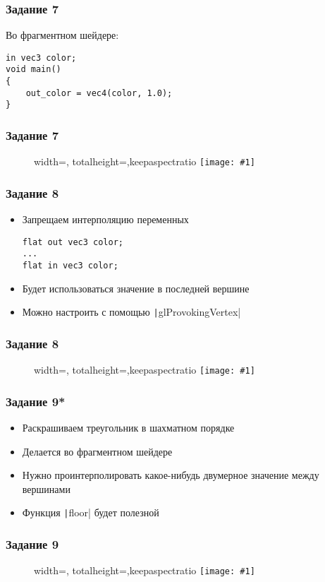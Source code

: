 \documentclass[10pt]{beamer}
\newcommand{\slideimage}[1]{
  \begin{figure}
    \begin{adjustbox}{width=\textwidth, totalheight=\textheight-2\baselineskip-2\baselineskip,keepaspectratio}
      \texttt{[image: \#1]}
    \end{adjustbox}
  \end{figure}
}
\begin{document}
\begin{frame}[fragile]
\frametitle{Задание 7}
Во фрагментном шейдере:
\begin{verbatim}
in vec3 color;
void main()
{
    out_color = vec4(color, 1.0);
}
\end{verbatim}
\end{frame}

\begin{frame}[fragile]
\frametitle{Задание 7}
\slideimage{task_7.png}
\end{frame}

\begin{frame}[fragile]
\frametitle{Задание 8}
\begin{itemize}
\item Запрещаем интерполяцию переменных
\begin{verbatim}
flat out vec3 color;
...
flat in vec3 color;
\end{verbatim}
\item Будет использоваться значение в последней вершине
\item Можно настроить с помощью \texttt|glProvokingVertex|
\end{itemize}
\end{frame}

\begin{frame}[fragile]
\frametitle{Задание 8}
\slideimage{task_8.png}
\end{frame}

\begin{frame}[fragile]
\frametitle{Задание 9*}
\begin{itemize}
\item Раскрашиваем треугольник в шахматном порядке
\item Делается во фрагментном шейдере
\item Нужно проинтерполировать какое-нибудь двумерное значение между вершинами
\item Функция \texttt|floor| будет полезной
\end{itemize}
\end{frame}

\begin{frame}[fragile]
\frametitle{Задание 9}
\slideimage{task_9.png}
\end{frame}
\end{document}
